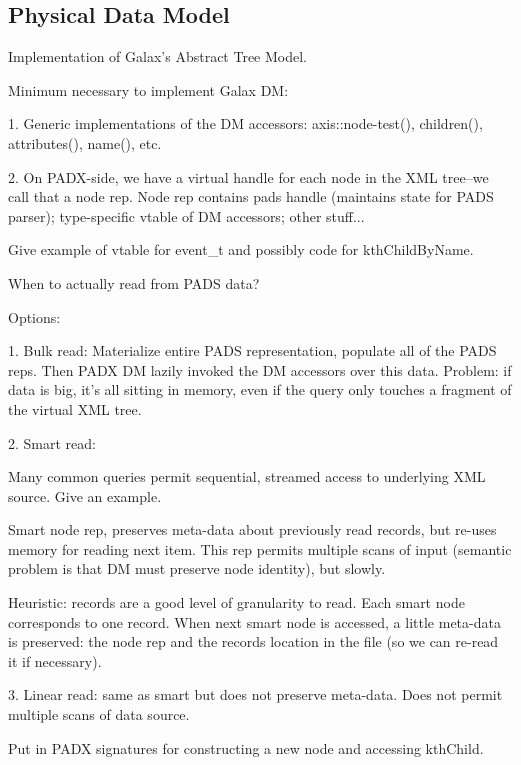 \subsection{Physical Data Model}

Implementation of Galax's Abstract Tree Model.

Minimum necessary to implement Galax DM:

1. Generic implementations of the DM accessors: axis::node-test(), children(),
   attributes(), name(), etc. 

2. On PADX-side, we have a virtual handle for each node in the XML
   tree--we call that a node rep.  Node rep contains pads handle
   (maintains state for PADS parser); type-specific vtable of DM
   accessors; other stuff...

   Give example of vtable for event\_t and possibly code for
   kthChildByName. 

When to actually read from PADS data?

Options: 

1. Bulk read: Materialize entire PADS representation, populate all of the PADS
reps.  Then PADX DM lazily invoked the DM accessors over this data.
Problem: if data is big, it's all sitting in memory, even if the query
only touches a fragment of the virtual XML tree.

2. Smart read: 

Many common queries permit sequential, streamed access to underlying
XML source.  Give an example.  

Smart node rep, preserves meta-data about previously read records, but
re-uses memory for reading next item.  This rep permits multiple scans
of input (semantic problem is that DM must preserve node identity),
but slowly. 

Heuristic: records are a good level of granularity to read.   Each
smart node corresponds to one record.  When next smart node is
accessed, a little meta-data is preserved: the node rep and the
records location in the file (so we can re-read it if necessary).

3. Linear read: same as smart but does not preserve meta-data.
   Does not permit multiple scans of data source. 

Put in PADX signatures for constructing a new node and accessing
kthChild. 

